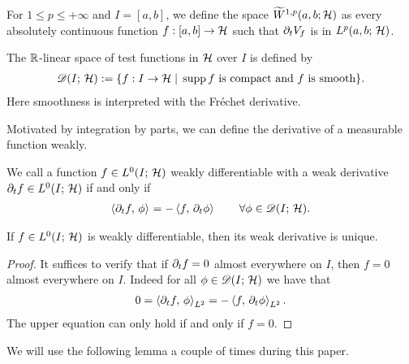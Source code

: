 \begin{definition}
	For $ 1\leq p\leq \plus\infty $ and $ I=[a,b] $, we define the space 
	$ \widetilde W^{1,p}(a,b;\mathcal{H}) $ as every absolutely continuous
	function $ f:[a,b]\rightarrow\mathcal{H} $ such that $ \partial_t V_f $
	is in $ L^p(a,b;\,\mathcal{H}) $. 
\end{definition}

\begin{definition}
	The $ \mathbb{R} $-linear space
	of test functions in $ \mathcal{H} $ over $ I $ is defined by
	\begin{align*}
		\mathscr{D}(I;\,\mathcal{H}):=\{f:I\rightarrow\mathcal{H}
		\;\vert\; 
		\operatorname{\mathrm{supp}} f\text{ is compact and }f\text{ is smooth}\}.
	\end{align*}
	Here smoothness is interpreted with the Fréchet derivative. 
\end{definition}

Motivated by integration by parts, we can define
the derivative of a measurable function weakly.

\begin{definition}\label{definition:weak der}
	We call a function $ f\in L^0(I;\,\mathcal{H}) $ weakly differentiable
	with a weak derivative $ \partial_t f\in L^0(I;\,\mathcal{H}) $ if
	and only if
	\begin{align*}
		\left\langle \partial_t f,\,\phi\right\rangle_{}
		=-\left\langle f,\,\partial_t \phi\right\rangle_{}
		\qquad\forall\phi\in\mathscr{D}(I;\,\mathcal{H}).
	\end{align*}
\end{definition}

\begin{lemma}
	If $ f\in L^0(I;\,\mathcal{H}) $ is weakly differentiable,
	then its weak derivative is unique.
\end{lemma}
\begin{proof}
	It suffices to verify that if $ \partial_t f=0 $
	almost everywhere on $ I $, then $ f=0 $
	almost everywhere on $ I $. Indeed for
	all $ \phi\in\mathscr{D}(I;\,\mathcal{H}) $ we have that
	\begin{align*}
		0
		=\left\langle \partial_t f,\,\phi\right\rangle_{L^2}
		=-\left\langle f,\,\partial_t \phi\right\rangle_{L^2}.
	\end{align*} 
	The upper equation can only hold if
	and only if $ f=0 $.
\end{proof}

We will use the following lemma a couple
of times during this paper.

